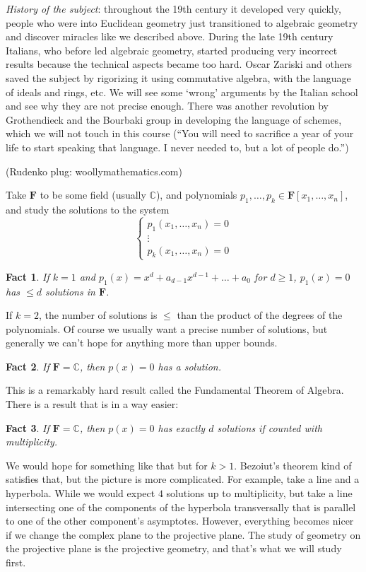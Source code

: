\documentclass[12pt]{article}
\newcommand{\F}{\mathbf{F}}
\newcommand{\C}{\mathbb{C}}
\newtheorem{fact}{Fact}
\begin{document}
        \textit{History of the subject}: throughout the 19th century it developed very quickly, people who were into Euclidean geometry just transitioned to algebraic geometry and discover miracles like we described above. During the late 19th century Italians, who before led algebraic geometry, started producing very incorrect results because the technical aspects became too hard. Oscar Zariski and others saved the subject by rigorizing it using commutative algebra, with the language of ideals and rings, etc. We will see some `wrong' arguments by the Italian school and see why they are not precise enough. There was another revolution by Grothendieck and the Bourbaki group in developing the language of schemes, which we will not touch in this course (``You will need to sacrifice a year of your life to start speaking that language. I never needed to, but a lot of people do.'')\par 
        (Rudenko plug: woollymathematics.com)\par 
        Take $\F$ to be some field (usually $\C$), and polynomials $p_1, \dots, p_k \in \F[x_1, \dots, x_n]$, and study the solutions to the system 
        $$\begin{cases}
            p_1(x_1, \dots, x_n) = 0 \\
            \vdots \\
            p_k(x_1, \dots, x_n) = 0
        \end{cases}$$
        \begin{fact}
            If $k = 1$ and $p_1(x) = x^d + a_{d-1}x^{d-1} + \dots + a_0$ for $d \geq 1$, $p_1(x) = 0$ has $\leq d$ solutions in $\F$. 
        \end{fact}
        If $k = 2$, the number of solutions is $\leq$ than the product of the degrees of the polynomials. Of course we usually want a precise number of solutions, but generally we can't hope for anything more than upper bounds. 
        \begin{fact}
            If $\F = \C$, then $p(x) = 0$ has a solution. 
        \end{fact}
        This is a remarkably hard result called the Fundamental Theorem of Algebra. There is a result that is in a way easier:
        \begin{fact}
            If $\F = \C$, then $p(x) = 0$ has exactly $d$ solutions if counted with multiplicity. 
        \end{fact} 
        We would hope for something like that but for $k > 1$. Bezoiut's theorem kind of satisfies that, but the picture is more complicated. For example, take a line and a hyperbola. While we would expect $4$ solutions up to multiplicity, but take a line intersecting one of the components of the hyperbola transversally that is parallel to one of the other component's asymptotes. However, everything becomes nicer if we change the complex plane to the projective plane. The study of geometry on the projective plane is the projective geometry, and that's what we will study first. \par 
\end{document}
